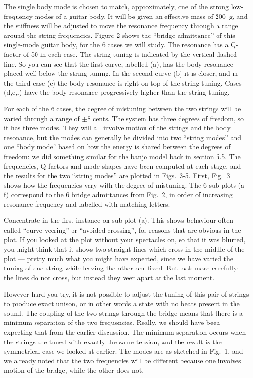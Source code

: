   The single body mode is chosen to match, approximately, one of the strong 
  low-frequency modes of a guitar body. It will be given an effective mass of 
  200~g, and the stiffness will be adjusted to move the resonance frequency 
  through a range around the string frequencies. Figure 2 shows the “bridge 
  admittance” of this single-mode guitar body, for the 6 cases we will study. 
  The resonance has a Q-factor of 50 in each case. The string tuning is 
  indicated by the vertical dashed line. So you can see that the first curve, 
  labelled (a), has the body resonance placed well below the string tuning. In 
  the second curve (b) it is closer, and in the third case (c) the body 
  resonance is right on top of the string tuning. Cases (d,e,f) have the body 
  resonance progressively higher than the string tuning. 

  For each of the 6 cases, the degree of mistuning between the two strings will 
  be varied through a range of $\pm8$ cents. The system has three degrees of 
  freedom, so it has three modes. They will all involve motion of the strings 
  and the body resonance, but the modes can generally be divided into two 
  ``string modes'' and one ``body mode'' based on how the energy is shared 
  between the degrees of freedom: we did something similar for the banjo model 
  back in section 5.5. The frequencies, Q-factors and mode shapes have been 
  computed at each stage, and the results for the two ``string modes'' are 
  plotted in Figs.\ 3-5. First, Fig.\ 3 shows how the frequencies vary with the 
  degree of mistuning. The 6 sub-plots (a--f) correspond to the 6 bridge 
  admittances from Fig.\ 2, in order of increasing resonance frequency and 
  labelled with matching letters. 

  Concentrate in the first instance on sub-plot (a). This shows behaviour often 
  called ``curve veering'' or ``avoided crossing'', for reasons that are 
  obvious in the plot. If you looked at the plot without your spectacles on, so 
  that it was blurred, you might think that it shows two straight lines which 
  cross in the middle of the plot --- pretty much what you might have expected, 
  since we have varied the tuning of one string while leaving the other one 
  fixed. But look more carefully: the lines do not cross, but instead they veer 
  apart at the last moment. 

  However hard you try, it is not possible to adjust the tuning of this pair of 
  strings to produce exact unison, or in other words a state with no beats 
  present in the sound. The coupling of the two strings through the bridge 
  means that there is a minimum separation of the two frequencies. Really, we 
  should have been expecting that from the earlier discussion. The minimum 
  separation occurs when the strings are tuned with exactly the same tension, 
  and the result is the symmetrical case we looked at earlier. The modes are as 
  sketched in Fig.\ 1, and we already noted that the two frequencies will be 
  different because one involves motion of the bridge, while the other does 
  not. 

